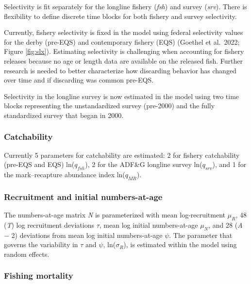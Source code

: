 \documentclass[
]{article}
\begin{document}
Selectivity is fit separately for the longline fishery (\emph{fsh}) and survey (\emph{srv}). There is flexibility to define discrete time blocks for both fishery and survey selectivity.

Currently, fishery selectivity is fixed in the model using federal selectivity values for the derby (pre-EQS) and contemporary fishery (EQS) (Goethel et al.~2022; Figure \ref{fig:slx}). Estimating selectivity is challenging when accounting for fishery releases because no age or length data are available on the released fish. Further research is needed to better characterize how discarding behavior has changed over time and if discarding was common pre-EQS.

Selectivity in the longline survey is now estimated in the model using two time blocks representing the unstandardized survey (pre-2000) and the fully standardized survey that began in 2000.

\hypertarget{catchability}{%
\subsubsection{Catchability}\label{catchability}}

Currently 5 parameters for catchability are estimated: 2 for fishery catchability (pre-EQS and EQS) ln(\emph{\(q_{fsh}\)}), 2 for the ADF\&G longline survey ln(\emph{\(q_{srv}\)}), and 1 for the mark--recapture abundance index ln(\emph{\(q_{MR}\)}).

\hypertarget{recruitment-and-initial-numbers-at-age}{%
\subsubsection{Recruitment and initial numbers-at-age}\label{recruitment-and-initial-numbers-at-age}}

The numbers-at-age matrix \emph{N} is parameterized with mean log-recruitment \emph{\(\mu_R\)}, 48 (\emph{T}) log recruitment deviations \emph{\(\tau\)}, mean log initial numbers-at-age \emph{\(\mu_N\)}, and 28 (\emph{A} − 2) deviations from mean log initial numbers-at-age \emph{\(\psi\)}. The parameter that governs the variability in \emph{\(\tau\)} and \emph{\(\psi\)}, ln(\emph{\(\sigma_R\)}), is estimated within the model using random effects.

\hypertarget{fishing-mortality}{%
\subsubsection{Fishing mortality}\label{fishing-mortality}}
\end{document}
